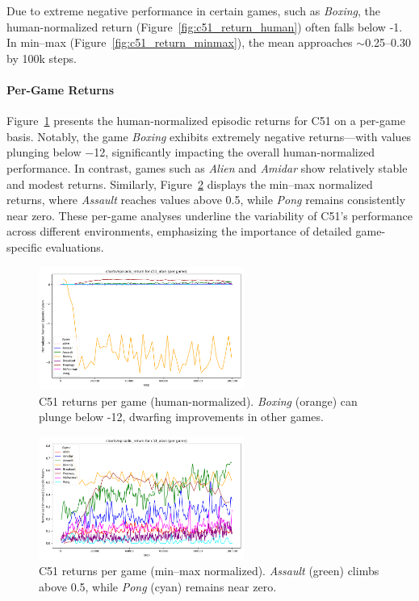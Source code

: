 Due to extreme negative performance in certain games, such as \emph{Boxing}, 
the human-normalized return (Figure~\vref{fig:c51_return_human}) 
often falls below -1. In min--max (Figure~\vref{fig:c51_return_minmax}), 
the mean approaches $\sim$\num{0.25}--\num{0.30} by 100k steps.

\paragraph{Per-Game Returns}
Figure~\ref{fig:c51_return_pergame_human} presents the human-normalized episodic returns for C51 on a per-game basis. Notably, the game \emph{Boxing} exhibits extremely negative returns—with values plunging below \num{-12}, significantly impacting the overall human-normalized performance. In contrast, games such as \emph{Alien} and \emph{Amidar} show relatively stable and modest returns. Similarly, Figure~\ref{fig:c51_return_pergame_minmax} displays the min--max normalized returns, where \emph{Assault} reaches values above \num{0.5}, while \emph{Pong} remains consistently near zero. These per-game analyses underline the variability of C51's performance across different environments, emphasizing the importance of detailed game-specific evaluations.

\begin{figure}
	\centering
	\includegraphics[width=0.6\textwidth]{figures/c51/charts_episodic_return_per_game_human_c51_atari.png}
	\caption{C51 returns per game (human-normalized). 
		\emph{Boxing} (orange) can plunge below -12, dwarfing improvements in other games.}
	\label{fig:c51_return_pergame_human}
\end{figure}

\begin{figure}
	\centering
	\includegraphics[width=0.6\textwidth]{figures/c51/charts_episodic_return_per_game_minmax_c51_atari.png}
	\caption{C51 returns per game (min--max normalized). 
		\emph{Assault} (green) climbs above 0.5, while \emph{Pong} (cyan) remains near zero.}
	\label{fig:c51_return_pergame_minmax}
\end{figure}

